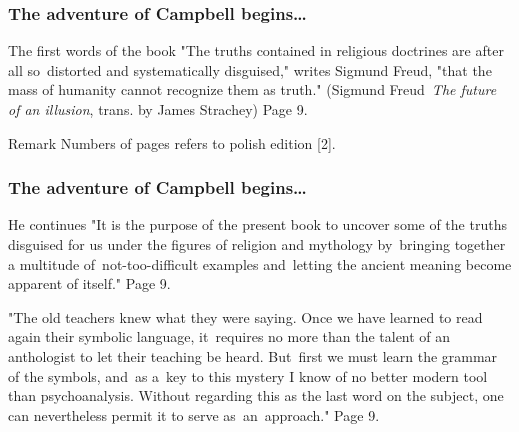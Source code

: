 \documentclass[10pt,t]{beamer}
\begin{document}
\begin{frame}
  \frametitle{The adventure of Campbell begins\ldots}

  \begin{block}{The first words of the book}
    "The truths contained in religious doctrines are after all
    so~distorted and systematically disguised," writes Sigmund Freud,
    "that the mass of humanity cannot recognize them as
    truth." %
    (Sigmund Freud~\emph{The future of an illusion}, trans. by James
    Strachey) Page 9.
  \end{block}

  \begin{block}{Remark}
    Numbers of pages refers to polish edition [2].
  \end{block}

\end{frame}



\begin{frame}
  \frametitle{The adventure of Campbell begins\ldots}

  \begin{block}{He continues}
    "It is the purpose of the present book to uncover some of the
    truths disguised for us under the figures of religion and
    mythology by~bringing together a multitude of~not-too-difficult
    examples and~letting the ancient meaning become apparent of
    itself." Page 9.
  \end{block}
  \pause

  \begin{block}{}
    "The old teachers knew what they were saying. Once we have learned
    to read again their symbolic language, it~requires no more than
    the talent of an anthologist to let their teaching be heard.
    But~first we must learn the grammar of the symbols, and~as a~key
    to this mystery I know of no better modern tool than
    psychoanalysis. Without regarding this as the last word on the
    subject, one can nevertheless permit it to serve as~an~approach."
    Page 9.
  \end{block}

\end{frame}
\end{document}
